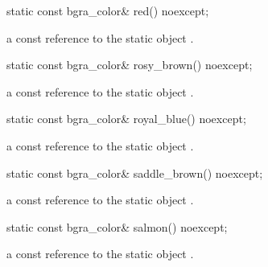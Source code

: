 \begin{itemdecl}
static const bgra_color& red() noexcept;
\end{itemdecl}
\begin{itemdescr}
\pnum
\returns
a const reference to the static  object .
\end{itemdescr}

\begin{itemdecl}
static const bgra_color& rosy_brown() noexcept;
\end{itemdecl}
\begin{itemdescr}
\pnum
\returns
a const reference to the static  object .
\end{itemdescr}

\begin{itemdecl}
static const bgra_color& royal_blue() noexcept;
\end{itemdecl}
\begin{itemdescr}
\pnum
\returns
a const reference to the static  object .
\end{itemdescr}

\begin{itemdecl}
static const bgra_color& saddle_brown() noexcept;
\end{itemdecl}
\begin{itemdescr}
\pnum
\returns
a const reference to the static  object .
\end{itemdescr}

\begin{itemdecl}
static const bgra_color& salmon() noexcept;
\end{itemdecl}
\begin{itemdescr}
\pnum
\returns
a const reference to the static  object .
\end{itemdescr}

